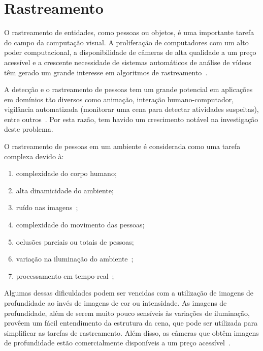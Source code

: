 \section {Rastreamento}	

	O rastreamento de entidades, como pessoas ou objetos, é uma importante tarefa do campo da computação visual. A proliferação de computadores com um alto poder computacional, a disponibilidade de câmeras de alta qualidade a um preço acessível e a crescente necessidade de sistemas automáticos de análise de vídeos têm gerado um grande interesse em algoritmos de rastreamento~\cite{yilmaz}.


	A detecção e o rastreamento de pessoas tem um grande potencial em aplicações em domínios tão diversos como animação, interação humano-computador, vigilância automatizada (monitorar uma cena para detectar atividades suspeitas), entre outros~\cite{yilmaz}. Por esta razão, tem havido um crescimento notável na investigação deste problema.

	O rastreamento de pessoas em um ambiente é considerada como uma tarefa complexa devido à:

		\begin{enumerate}
			\item complexidade do corpo humano;
			\item alta dinamicidade do ambiente;
			\item ruído nas imagens~\cite{yilmaz};
			\item complexidade do movimento das pessoas;
			\item oclusões parciais ou totais de pessoas;
			\item variação na iluminação do ambiente~\cite{yilmaz};
			\item processamento em tempo-real~\cite{yilmaz};
		\end{enumerate}

	Algumas dessas dificuldades podem ser vencidas com a utilização de imagens de profundidade ao invés de imagens de cor ou intensidade. As imagens de profundidade, além de serem muito pouco sensíveis às variações de iluminação, provêem um fácil entendimento da estrutura da cena, que pode ser utilizada para simplificar as tarefas de rastreamento. Além disso, as câmeras que obtêm imagens de profundidade estão comercialmente disponíveis a um preço acessível~\cite{nikos}.

